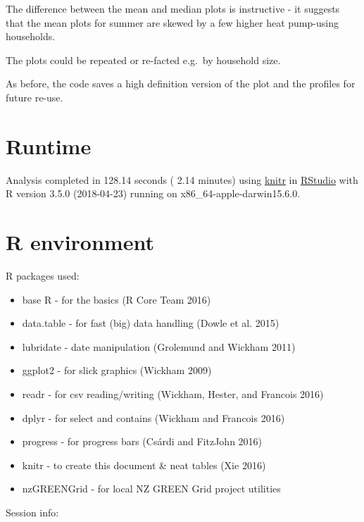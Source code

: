 \documentclass[]{article}
\providecommand{\tightlist}{%
  \setlength{\itemsep}{0pt}\setlength{\parskip}{0pt}}
\begin{document}
The difference between the mean and median plots is instructive - it
suggests that the mean plots for summer are skewed by a few higher heat
pump-using households.

The plots could be repeated or re-facted e.g.~by household size.

As before, the code saves a high definition version of the plot and the
profiles for future re-use.

\section{Runtime}\label{runtime}

Analysis completed in 128.14 seconds ( 2.14 minutes) using
\href{https://cran.r-project.org/package=knitr}{knitr} in
\href{http://www.rstudio.com}{RStudio} with R version 3.5.0 (2018-04-23)
running on x86\_64-apple-darwin15.6.0.

\section{R environment}\label{r-environment}

R packages used:

\begin{itemize}
\tightlist
\item
  base R - for the basics (R Core Team 2016)
\item
  data.table - for fast (big) data handling (Dowle et al. 2015)
\item
  lubridate - date manipulation (Grolemund and Wickham 2011)
\item
  ggplot2 - for slick graphics (Wickham 2009)
\item
  readr - for csv reading/writing (Wickham, Hester, and Francois 2016)
\item
  dplyr - for select and contains (Wickham and Francois 2016)
\item
  progress - for progress bars (Csárdi and FitzJohn 2016)
\item
  knitr - to create this document \& neat tables (Xie 2016)
\item
  nzGREENGrid - for local NZ GREEN Grid project utilities
\end{itemize}

Session info:
\end{document}
